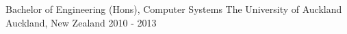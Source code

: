 


\begin{cventries}


\cventry
{Bachelor of Engineering (Hons), Computer Systems} %
{The University of Auckland} %
{Auckland, New Zealand} %
{2010 - 2013} %
{ %
}


\end{cventries}
